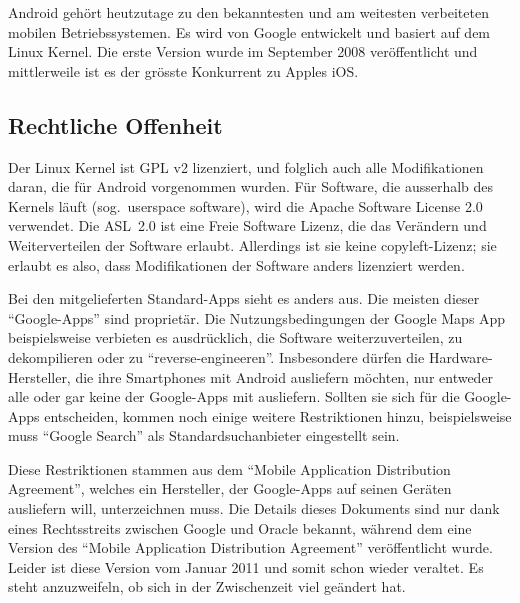 Android gehört heutzutage zu den bekanntesten und am weitesten verbeiteten mobilen Betriebssystemen. Es wird von Google entwickelt und basiert auf dem Linux Kernel. Die erste Version wurde im September 2008 veröffentlicht und mittlerweile ist es der grösste Konkurrent zu Apples iOS.
\newline

\subsection{Rechtliche Offenheit}
Der Linux Kernel ist GPL v2 lizenziert\thinspace\cite{online:kernel-license}, und folglich auch alle Modifikationen daran, die für Android vorgenommen wurden. Für Software, die ausserhalb des Kernels läuft (sog.\ userspace software), wird die Apache Software License 2.0 verwendet\thinspace\cite{online:android-licenses}. Die \mbox{ASL 2.0} ist eine Freie Software Lizenz, die das Verändern und Weiterverteilen der Software erlaubt. Allerdings ist sie  keine copyleft-Lizenz; sie erlaubt es also, dass Modifikationen der Software anders lizenziert werden\thinspace\cite{online:apache-license}.

Bei den mitgelieferten Standard-Apps sieht es anders aus. Die meisten dieser ``Google-Apps'' sind proprietär. Die Nutzungsbedingungen der Google Maps App beispielsweise verbieten es ausdrücklich, die Software weiterzuverteilen, zu dekompilieren oder zu ``reverse-engineeren''\thinspace\cite{online:google-maps-tos}. Insbesondere dürfen die \mbox{Hardware-Hersteller}, die ihre Smartphones mit Android ausliefern möchten, nur entweder alle oder gar keine der Google-Apps mit ausliefern. Sollten sie sich für die Google-Apps entscheiden, kommen noch einige weitere Restriktionen hinzu, beispielsweise muss ``Google Search'' als Standardsuchanbieter eingestellt sein\thinspace\cite{online:mada-leak}.

Diese Restriktionen stammen aus dem ``Mobile Application Distribution Agreement'', welches ein Hersteller, der Google-Apps auf seinen Geräten ausliefern will, unterzeichnen muss. Die Details dieses Dokuments sind nur dank eines Rechtsstreits zwischen Google und Oracle bekannt, während dem eine Version des ``Mobile Application Distribution Agreement'' veröffentlicht wurde\thinspace\cite{online:ars-mada-leak}. Leider ist diese Version vom Januar 2011 und somit schon wieder veraltet. Es steht anzuzweifeln, ob sich in der Zwischenzeit viel geändert hat.
\newline

